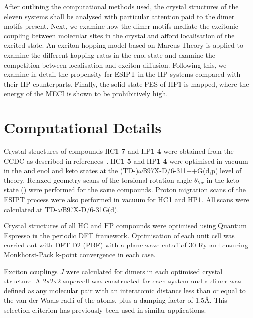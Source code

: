 After outlining the computational methods used, the crystal structures of the eleven systems shall be analysed with particular attention paid to the dimer motifs present. Next, we examine how the dimer motifs mediate the excitonic coupling between molecular sites in the crystal and afford localisation of the excited state. An exciton hopping model based on Marcus Theory is applied to examine the different hopping rates in the enol state and examine the competition between localisation and exciton diffusion. Following this, we examine in detail the propensity for ESIPT in the \ac{HP} systems compared with their \ac{HP} counterparts. Finally, the solid state \ac{PES}  of \ac{HP}\textbf{1} is mapped, where the energy of the \ac{MECI} is shown to be prohibitively high.
\section{Computational Details}\label{section: Connecting_Comp}
Crystal structures of compounds \ac{HC}\textbf{1}-\textbf{7} and \ac{HP}\textbf{1}-\textbf{4} were obtained from the CCDC as described in references{~}. \ac{HC}\textbf{1}-\textbf{5} and  \ac{HP}\textbf{1}-\textbf{4} were optimised in vacuum in the \szero{} and \sone{} enol and keto states at the (TD-)$\omega$B97X-D/6-311++G(d,p) level of theory. Relaxed geometry scans of the torsional rotation angle $\theta_{tor}$ in the keto \sone{} state (\Kstar) were performed for the same compounds. Proton migration scans of the ESIPT process were also performed in vacuum for \ac{HC}\textbf{1} and \ac{HP}\textbf{1}. All scans were calculated at TD-$\omega$B97X-D/6-31G(d). 

Crystal structures of all \ac{HC} and \ac{HP} compounds were optimised using Quantum Espresso in the periodic DFT framework.\cite{QE-2009} Optimisation of each unit cell was carried out with DFT-D2 (PBE) with a plane-wave cutoff of 30 Ry and ensuring Monkhorst-Pack k-point convergence in each case.

Exciton couplings \textit{J} were calculated for dimers in each optimised crystal structure. A 2x2x2 supercell was constructed for each system and a dimer was defined as any molecular pair with an interatomic distance less than or equal to the van der Waals radii of the atoms, plus a damping factor of 1.5\AA. This selection criterion has previously been used in similar applications.\cite{Campbell2017} 

